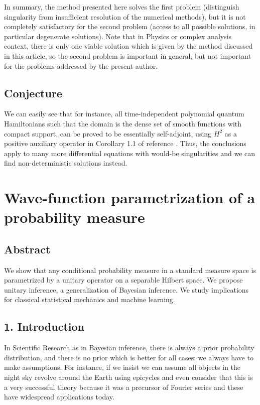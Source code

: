 \documentclass[11pt]{book}
\begin{document}
In summary, the method presented here solves the first problem
(distinguish singularity from insufficient resolution of the numerical
methods), but it is not completely satisfactory for the second problem
(access to all possible solutions, in particular degenerate solutions).
Note that in Physics or complex analysis context, there is only one
viable solution which is given by the method discussed in this article,
so the second problem is important in general, but not important for the
problems addressed by the present author.

\hypertarget{conjecture}{%
\section{Conjecture}\label{conjecture}}

We can easily see that for instance, all time-independent polynomial
quantum Hamiltonians such that the domain is the dense set of smooth
functions with compact support, can be proved to be essentially
self-adjoint\cite{cmpux2f1103859517}\cite{faris2006self}, using \(H^2\) as a positive auxiliary operator in
Corollary 1.1 of reference
\cite{cmpux2f1103859517}. Thus, the conclusions apply to many more differential equations
with would-be singularities and we can find non-deterministic solutions
instead.

\chapter{Wave-function parametrization of a probability measure}
\section*{Abstract}
We show that any conditional probability measure in a standard measure
space is parametrized by a unitary operator on a separable Hilbert
space. We propose unitary inference, a generalization of Bayesian
inference. We study implications for classical statistical mechanics and
machine learning.


\hypertarget{introduction}{%
\section{1. Introduction}\label{introduction}}

In Scientific Research as in Bayesian inference, there is always a prior
probability distribution, and there is no prior which is better for all
cases\cite{dutchbook}: we
always have to make assumptions. For instance, if we insist we can
assume all objects in the night sky revolve around the Earth using
epicycles and even consider that this is a very successful theory
because it was a precursor of Fourier series and these have widespread
applications today\cite{acosta2019epicycles}.
\end{document}

